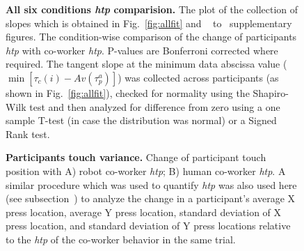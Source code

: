 \documentclass[a4paper, 12pt, oneside]{Thesis}  %
\begin{document}
\begin{figure}[hpt]
	\caption{{\bf All six conditions \textit{htp} comparision.} The plot of the collection of slopes which is obtained in Fig.~\ref{fig:allfit} and ~ to~ supplementary figures. The condition-wise comparison of the change of participants {\it htp} with co-worker {\it htp}. P-values are Bonferroni corrected where required. The tangent slope at the minimum data abscissa value ($\min[\tau_c(i)-Av(\tau_p^a)]$) was collected across participants (as shown in Fig.~\ref{fig:allfit}), checked for normality using the Shapiro-Wilk test and then analyzed for difference from zero using a one sample T-test (in case the distribution was normal) or a Signed Rank test.}
	\label{fig:slope_allcond}
\end{figure}



\begin{figure}[hpt]
	\caption{{\bf Participants touch variance.} Change of participant touch position with A) robot co-worker {\it htp}; B) human co-worker {\it htp}. A similar procedure which was used to quantify {\it htp} was also used here (see subsection~) to analyze the change in a participant's average X press location, average Y press location, standard deviation of X press location, and standard deviation of Y press locations relative to the {\it htp} of the co-worker behavior in the same trial.}
	\label{fig:variance}
\end{figure}
\end{document}
